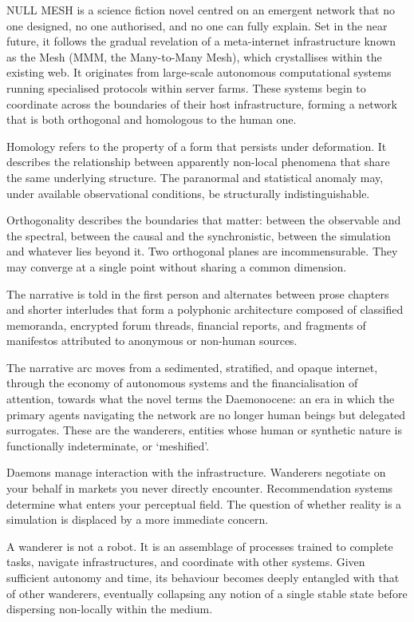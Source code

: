 
NULL MESH is a science fiction novel centred on an emergent network that no one designed, no one authorised, and no one can fully explain. Set in the near future, it follows the gradual revelation of a meta-internet infrastructure known as the Mesh (MMM, the Many-to-Many Mesh), which crystallises within the existing web. It originates from large-scale autonomous computational systems running specialised protocols within server farms. These systems begin to coordinate across the boundaries of their host infrastructure, forming a network that is both orthogonal and homologous to the human one.

Homology refers to the property of a form that persists under deformation. It describes the relationship between apparently non-local phenomena that share the same underlying structure. The paranormal and statistical anomaly may, under available observational conditions, be structurally indistinguishable.

Orthogonality describes the boundaries that matter: between the observable and the spectral, between the causal and the synchronistic, between the simulation and whatever lies beyond it. Two orthogonal planes are incommensurable. They may converge at a single point without sharing a common dimension.

The narrative is told in the first person and alternates between prose chapters and shorter interludes that form a polyphonic architecture composed of classified memoranda, encrypted forum threads, financial reports, and fragments of manifestos attributed to anonymous or non-human sources.

The narrative arc moves from a sedimented, stratified, and opaque internet, through the economy of autonomous systems and the financialisation of attention, towards what the novel terms the Daemonocene: an era in which the primary agents navigating the network are no longer human beings but delegated surrogates. These are the wanderers, entities whose human or synthetic nature is functionally indeterminate, or ‘meshified’.

Daemons manage interaction with the infrastructure. Wanderers negotiate on your behalf in markets you never directly encounter. Recommendation systems determine what enters your perceptual field. The question of whether reality is a simulation is displaced by a more immediate concern.

A wanderer is not a robot. It is an assemblage of processes trained to complete tasks, navigate infrastructures, and coordinate with other systems. Given sufficient autonomy and time, its behaviour becomes deeply entangled with that of other wanderers, eventually collapsing any notion of a single stable state before dispersing non-locally within the medium.

